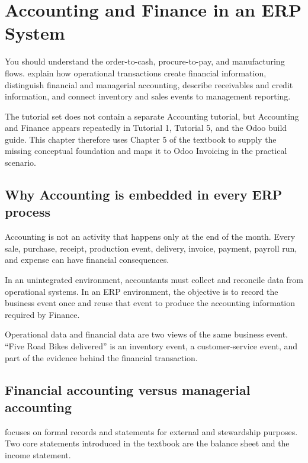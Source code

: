 \chapter{Accounting and Finance in an ERP System}
\label{ch:accounting}

\chapterguide
  {You should understand the order-to-cash, procure-to-pay, and manufacturing flows.}
  {explain how operational transactions create financial information, distinguish financial and managerial accounting, describe receivables and credit information, and connect inventory and sales events to management reporting.}

\begin{sourcebasis}
The tutorial set does not contain a separate Accounting tutorial, but Accounting and Finance appears repeatedly in Tutorial 1, Tutorial 5, and the Odoo build guide. This chapter therefore uses Chapter 5 of the textbook to supply the missing conceptual foundation and maps it to Odoo Invoicing in the practical scenario.
\end{sourcebasis}

\section{Why Accounting is embedded in every ERP process}

Accounting is not an activity that happens only at the end of the month. Every sale, purchase, receipt, production event, delivery, invoice, payment, payroll run, and expense can have financial consequences.

In an unintegrated environment, accountants must collect and reconcile data from operational systems. In an ERP environment, the objective is to record the business event once and reuse that event to produce the accounting information required by Finance.

\begin{keyidea}
Operational data and financial data are two views of the same business event. ``Five Road Bikes delivered'' is an inventory event, a customer-service event, and part of the evidence behind the financial transaction.
\end{keyidea}

\section{Financial accounting versus managerial accounting}

 focuses on formal records and statements for external and stewardship purposes. Two core statements introduced in the textbook are the balance sheet and the income statement.

